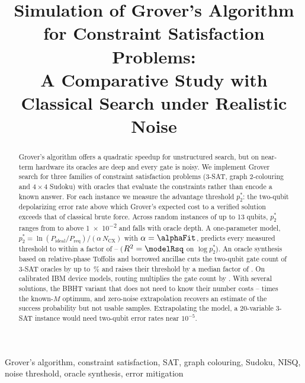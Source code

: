\documentclass[conference]{IEEEtran}
\newcommand{\todo}[1]{\textcolor{red}{[TODO: #1]}}
\begin{document}
\title{Simulation of Grover's Algorithm for Constraint Satisfaction Problems:\\
A Comparative Study with Classical Search under Realistic Noise}

\author{\IEEEauthorblockN{\todo{Author name}}
\IEEEauthorblockA{\todo{Affiliation}\\ \todo{email}}}

\maketitle

\begin{abstract}
Grover's algorithm offers a quadratic speedup for unstructured search, but on near-term hardware its oracles are deep and every gate is noisy. We implement Grover search for three families of constraint satisfaction problems (3-SAT, graph 2-colouring and $4\times4$ Sudoku) with oracles that evaluate the constraints rather than encode a known answer. For each instance we measure the advantage threshold $p_2^*$: the two-qubit depolarizing error rate above which Grover's expected cost to a verified solution exceeds that of classical brute force. Across \nInstances{} random instances of up to 13 qubits, $p_2^*$ ranges from \thrLowest{} to above \num{1e-2} and falls with oracle depth. A one-parameter model, $p_2^* = \ln(P_\text{ideal}/P_\text{req})/(\alpha\,N_\text{CX})$ with $\alpha=\alphaFit$, predicts every measured threshold to within a factor of \ratioMin--\ratioMax{} ($R^2=\modelRsq$ on $\log p_2^*$). An oracle synthesis based on relative-phase Toffolis and borrowed ancillae cuts the two-qubit gate count of 3-SAT oracles by up to \cxSavingMax\,\% and raises their threshold by a median factor of \gainSatMed. On calibrated IBM device models, routing multiplies the gate count by \routeOverhead. With several solutions, the BBHT variant that does not need to know their number costs \bbhtRatioMin--\bbhtRatioMax{} times the known-$M$ optimum, and zero-noise extrapolation recovers an estimate of the success probability but not usable samples. Extrapolating the model, a 20-variable 3-SAT instance would need two-qubit error rates near $10^{-5}$.
\end{abstract}

\begin{IEEEkeywords}
Grover's algorithm, constraint satisfaction, SAT, graph colouring, Sudoku, NISQ, noise threshold, oracle synthesis, error mitigation
\end{IEEEkeywords}
\end{document}
